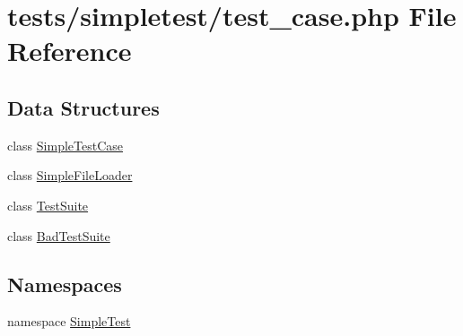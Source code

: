 \hypertarget{test__case_8php}{\section{tests/simpletest/test\-\_\-case.php File Reference}
\label{test__case_8php}
}
\subsection*{Data Structures}
\begin{DoxyCompactItemize}
\item 
class \hyperlink{class_simple_test_case}{Simple\-Test\-Case}
\item 
class \hyperlink{class_simple_file_loader}{Simple\-File\-Loader}
\item 
class \hyperlink{class_test_suite}{Test\-Suite}
\item 
class \hyperlink{class_bad_test_suite}{Bad\-Test\-Suite}
\end{DoxyCompactItemize}
\subsection*{Namespaces}
\begin{DoxyCompactItemize}
\item 
namespace \hyperlink{namespace_simple_test}{Simple\-Test}
\end{DoxyCompactItemize}
